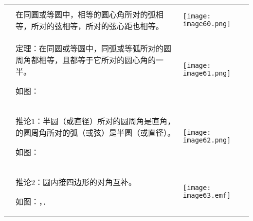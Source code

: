 \begin{longtable}[]{@{}lll@{}}
\toprule
\endhead
& &\tabularnewline
&
在同圆或等圆中，相等的圆心角所对的弧相等，所对的弦相等，所对的弦心距也相等。
&
\texttt{[image: image60.png]}\tabularnewline
\begin{minipage}[t]{0.30\columnwidth}\raggedright
\strut
\end{minipage} & \begin{minipage}[t]{0.30\columnwidth}\raggedright
定理：在同圆或等圆中，同弧或等弧所对的圆周角都相等，且都等于它所对的圆心角的一半。

如图：\strut
\end{minipage} & \begin{minipage}[t]{0.30\columnwidth}\raggedright
\texttt{[image: image61.png]}\strut
\end{minipage}\tabularnewline
\begin{minipage}[t]{0.30\columnwidth}\raggedright
\strut
\end{minipage} & \begin{minipage}[t]{0.30\columnwidth}\raggedright
推论1：半圆（或直径）所对的圆周角是直角，的圆周角所对的弧（或弦）是半圆（或直径）。

如图：\strut
\end{minipage} & \begin{minipage}[t]{0.30\columnwidth}\raggedright
\texttt{[image: image62.png]}\strut
\end{minipage}\tabularnewline
\begin{minipage}[t]{0.30\columnwidth}\raggedright
\strut
\end{minipage} & \begin{minipage}[t]{0.30\columnwidth}\raggedright
推论2：圆内接四边形的对角互补。

如图：，．\strut
\end{minipage} & \begin{minipage}[t]{0.30\columnwidth}\raggedright
\texttt{[image: image63.emf]}\strut
\end{minipage}\tabularnewline
\bottomrule
\end{longtable}

\hypertarget{section-18}{%
\subsubsection{}\label{section-18}}

